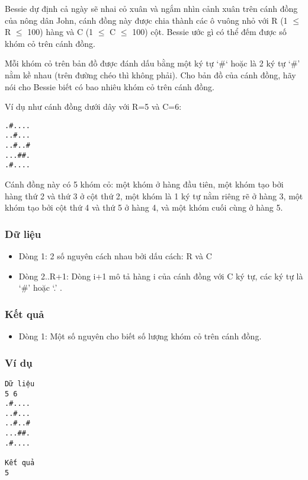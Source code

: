 



   Bessie dự định cả ngày sẽ nhai cỏ xuân và ngắm nhìn cảnh xuân trên  cánh đồng của nông dân John, cánh đồng này được chia thành các ô vuông nhỏ với R (1  $\le$  R  $\le$  100) hàng và C (1  $\le$  C  $\le$  100) cột. Bessie ước gì  có thể đếm được số khóm cỏ trên cánh đồng.  

   Mỗi khóm cỏ trên bản đồ được đánh dấu bằng một ký tự ‘\#‘ hoặc là 2 ký  tự ‘\#’ nằm kề nhau (trên đường chéo thì không phải). Cho bản đồ của  cánh đồng, hãy nói cho Bessie biết có bao nhiêu khóm cỏ trên  cánh đồng.  

   Ví dụ như cánh đồng dưới dây với R=5 và C=6:  
\begin{verbatim}
.#....
..#...
..#..#
...##.
.#....
\end{verbatim}

   Cánh đồng này có 5 khóm cỏ: một khóm ở hàng đầu tiên, một khóm tạo  bởi hàng thứ 2 và thứ 3 ở cột thứ 2, một khóm là 1 ký tự nằm riêng  rẽ ở hàng 3, một khóm tạo bởi cột thứ 4 và thứ 5 ở hàng 4, và một  khóm cuối cùng ở hàng 5.  

\subsubsection{   Dữ liệu  }
\begin{itemize}
	\item     Dòng 1: 2 số nguyên cách nhau bởi dấu cách: R và C   
	\item     Dòng 2..R+1: Dòng i+1 mô tả hàng i của cánh đồng với C         ký tự, các ký tự là ‘\#’ hoặc ‘.’ .   
\end{itemize}

\subsubsection{   Kết quả  }
\begin{itemize}
	\item     Dòng 1: Một số nguyên cho biết số lượng khóm cỏ trên cánh đồng.   
\end{itemize}

\subsubsection{   Ví dụ  }
\begin{verbatim}
Dữ liệu
5 6
.#....
..#...
..#..#
...##.
.#....

Kết quả
5
\end{verbatim}
